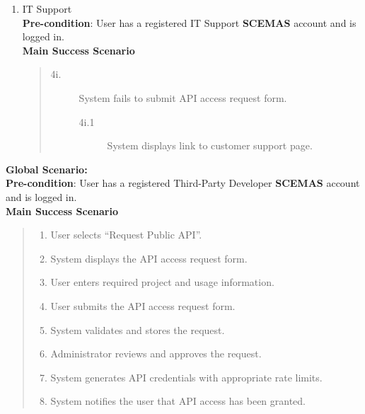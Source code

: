 \documentclass[]{article}
\begin{document}
\begin{enumerate}[{\bf BE7.}]
\begin{enumerate}[{\bf VP1.}]
            \item IT Support \\
    \textbf{Pre-condition}: User has a registered IT Support \textbf{SCEMAS} account and is logged in.\\
    \textbf{Main Success Scenario}
    \begin{quote}
        \begin{description}
            \item[\textmd{4i.}] System fails to submit API access request form.
            \begin{description}
                \item[\textmd{4i.1}] System displays link to customer support page.
            \end{description}
        \end{description}
    \end{quote}


        \end{enumerate}
        {\bf Global Scenario:} \\
                \textbf{Pre-condition}: User has a registered Third-Party Developer \textbf{SCEMAS} account and is logged in.\\
                \textbf{Main Success Scenario}
                \begin{quote}
                    \begin{enumerate}[1.]
                        \item User selects ``Request Public API''.
                        \item System displays the API access request form.
                        \item User enters required project and usage information.
                        \item User submits the API access request form.
                        \item System validates and stores the request.
                        \item Administrator reviews and approves the request.
                        \item System generates API credentials with appropriate rate limits.
                        \item System notifies the user that API access has been granted.
                    \end{enumerate}
                \end{quote}


\end{enumerate}
\end{document}
